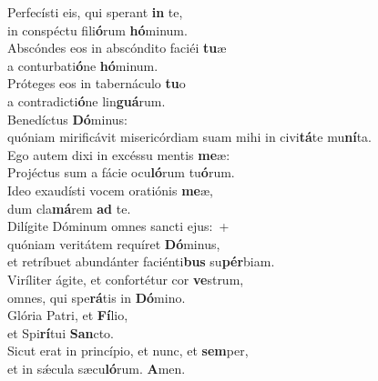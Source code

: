 \evenverse Perfecísti eis, qui sperant \textbf{in} te,~\*\\
\evenverse in conspéctu fili\textbf{ó}rum \textbf{hó}minum.\\
\oddverse Abscóndes eos in abscóndito faciéi \textbf{tu}æ~\*\\
\oddverse a conturbati\textbf{ó}ne \textbf{hó}minum.\\
\evenverse Próteges eos in tabernáculo \textbf{tu}o~\*\\
\evenverse a contradicti\textbf{ó}ne lin\textbf{guá}rum.\\
\oddverse Benedíctus \textbf{Dó}minus:~\*\\
\oddverse quóniam mirificávit misericórdiam suam mihi in civi\textbf{tá}te mu\textbf{ní}ta.\\
\evenverse Ego autem dixi in excéssu mentis \textbf{me}æ:~\*\\
\evenverse Projéctus sum a fácie ocu\textbf{ló}rum tu\textbf{ó}rum.\\
\oddverse Ideo exaudísti vocem oratiónis \textbf{me}æ,~\*\\
\oddverse dum cla\textbf{má}rem \textbf{ad} te.\\
\evenverse Dilígite Dóminum omnes sancti ejus:~+\\
\evenverse  quóniam veritátem requíret \textbf{Dó}minus,~\*\\
\evenverse et retríbuet abundánter faciénti\textbf{bus} su\textbf{pér}biam.\\
\oddverse Viríliter ágite, et confortétur cor \textbf{ve}strum,~\*\\
\oddverse omnes, qui spe\textbf{rá}tis in \textbf{Dó}mino.\\
\evenverse Glória Patri, et \textbf{Fí}lio,~\*\\
\evenverse et Spi\textbf{rí}tui \textbf{San}cto.\\
\oddverse Sicut erat in princípio, et nunc, et \textbf{sem}per,~\*\\
\oddverse et in sǽcula sæcu\textbf{ló}rum. \textbf{A}men.\\
